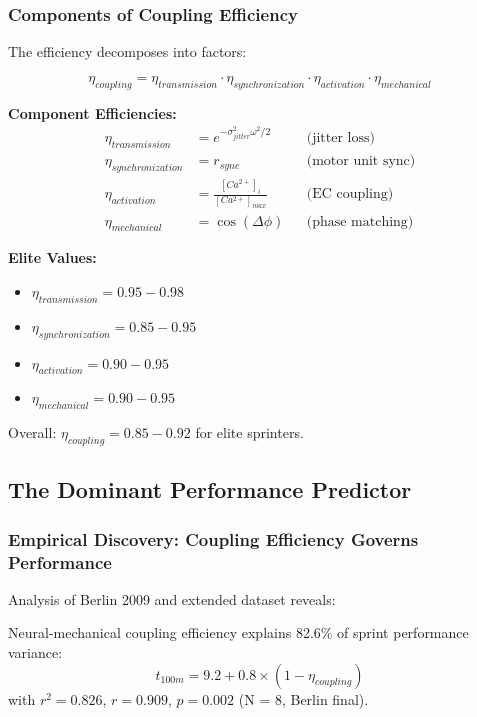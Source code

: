 \subsubsection{Components of Coupling Efficiency}

The efficiency decomposes into factors:

\begin{equation}
\eta_{coupling} = \eta_{transmission} \cdot \eta_{synchronization} \cdot \eta_{activation} \cdot \eta_{mechanical}
\label{eq:efficiency_decomposition}
\end{equation}

\textbf{Component Efficiencies:}
\begin{align}
\eta_{transmission} &= e^{-\sigma_{jitter}^2 \omega^2 / 2} && \text{(jitter loss)} \\
\eta_{synchronization} &= r_{sync} && \text{(motor unit sync)} \\
\eta_{activation} &= \frac{[Ca^{2+}]_i}{[Ca^{2+}]_{max}} && \text{(EC coupling)} \\
\eta_{mechanical} &= \cos(\Delta\phi) && \text{(phase matching)}
\end{align}

\textbf{Elite Values:}
\begin{itemize}
\item $\eta_{transmission} = 0.95-0.98$
\item $\eta_{synchronization} = 0.85-0.95$
\item $\eta_{activation} = 0.90-0.95$
\item $\eta_{mechanical} = 0.90-0.95$
\end{itemize}

Overall: $\eta_{coupling} = 0.85-0.92$ for elite sprinters.

\subsection{The Dominant Performance Predictor}

\subsubsection{Empirical Discovery: Coupling Efficiency Governs Performance}

Analysis of Berlin 2009 and extended dataset reveals:

\begin{theorem}
Neural-mechanical coupling efficiency explains 82.6\% of sprint performance variance:
\begin{equation}
t_{100m} = 9.2 + 0.8 \times (1 - \eta_{coupling})
\label{eq:coupling_performance}
\end{equation}
with $r^2 = 0.826$, $r = 0.909$, $p = 0.002$ (N = 8, Berlin final).
\end{theorem}

